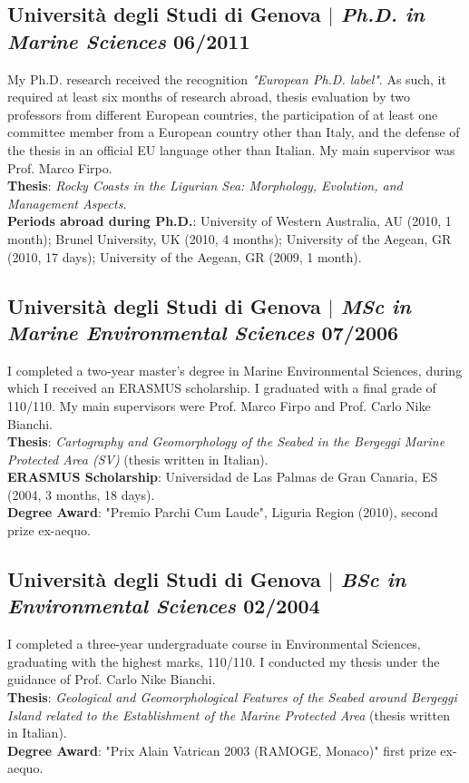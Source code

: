 \documentclass[11pt]{article}
\begin{document}
\subsection{Università degli Studi di Genova $|$ {\normalfont\textit{Ph.D. in Marine Sciences}} \hfill 06/2011}
{\footnotesize My Ph.D. research received the recognition \textit{"European Ph.D. label"}. As such, it required at least six months of research abroad, thesis evaluation by two professors from different European countries, the participation of at least one committee member from a European country other than Italy, and the defense of the thesis in an official EU language other than Italian. My main supervisor was Prof. Marco Firpo. \\
\textbf{Thesis}: \textit{Rocky Coasts in the Ligurian Sea: Morphology, Evolution, and Management Aspects}.\\ 
\textbf{Periods abroad during Ph.D.}: University of Western Australia, AU (2010, 1 month); Brunel University, UK (2010, 4 months); University of the Aegean, GR (2010, 17 days); University of the Aegean, GR (2009, 1 month).}
\bigskip

\subsection{Università degli Studi di Genova $|$ {\normalfont\textit{MSc in Marine Environmental Sciences}} \hfill 07/2006}
{\footnotesize I completed a two-year master's degree in Marine Environmental Sciences, during which I received an ERASMUS scholarship. I graduated with a final grade of 110/110. My main supervisors were Prof. Marco Firpo and Prof. Carlo Nike Bianchi. \\
\textbf{Thesis}: \textit{Cartography and Geomorphology of the Seabed in the Bergeggi Marine Protected Area (SV)} (thesis written in Italian).\\
\textbf{ERASMUS Scholarship}: Universidad de Las Palmas de Gran Canaria, ES (2004, 3 months, 18 days).\\
\textbf{Degree Award}: "Premio Parchi Cum Laude", Liguria Region (2010), second prize ex-aequo.}
\bigskip

\subsection{Università degli Studi di Genova $|$ {\normalfont\textit{BSc in Environmental Sciences}} \hfill 02/2004}
{\footnotesize I completed a three-year undergraduate course in Environmental Sciences, graduating with the highest marks, 110/110. I conducted my thesis under the guidance of Prof. Carlo Nike Bianchi. \\
\textbf{Thesis}: \textit{Geological and Geomorphological Features of the Seabed around Bergeggi Island related to the Establishment of the Marine Protected Area} (thesis written in Italian).\\
\textbf{Degree Award}: "Prix Alain Vatrican 2003 (RAMOGE, Monaco)" first prize ex-aequo.}
\newpage
\end{document}
